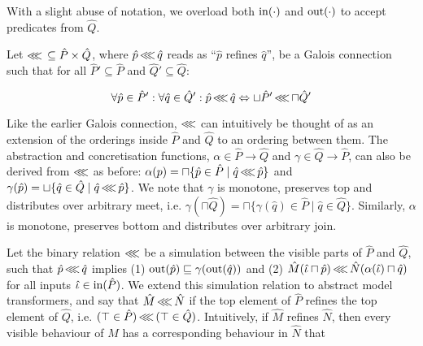 

\noindent With a slight abuse of notation, we overload both $\operatorname{in}(\cdot)$ and $\operatorname{out}(\cdot)$ to accept predicates from $\hat Q$.

Let $\operatorname{\lll} \, \subseteq \hat P \times \hat Q$, where $\hat p \operatorname{\lll} \hat q$ reads as ``$\hat p$ refines $\hat q$'', be a Galois connection such that for all $\hat P' \subseteq \hat P$ and $\hat Q' \subseteq \hat Q$:

\begin{equation*}
\forall \hat p \in \hat P' : \forall \hat q \in \hat Q' : \hat p \operatorname{\lll} \hat q \Leftrightarrow \sqcup \hat P' \operatorname{\lll} \sqcap \hat Q'
\end{equation*}

\noindent Like the earlier Galois connection, $\operatorname{\lll}$ can intuitively be thought of as an extension of the orderings inside $\hat P$ and $\hat Q$ to an ordering between them. The abstraction and concretisation functions, $\alpha \in \hat P \rightarrow \hat Q$ and $\gamma \in \hat Q \rightarrow \hat P$, can also be derived from $\operatorname{\lll}$ as before: $\alpha(p) = \sqcap \{ \hat p \in \hat P \mid \hat q \operatorname{\lll} \hat p \}$ and $\gamma(\hat p) = \sqcup \{ \hat q \in \hat Q \mid \hat q \operatorname{\lll} \hat p \}$. We note that $\gamma$ is monotone, preserves top and distributes over arbitrary meet, i.e. $\gamma(\sqcap \hat Q) = \sqcap \{ \gamma(\hat q) \in \hat P \mid \hat q \in \hat Q\}$. Similarly, $\alpha$ is monotone, preserves bottom and distributes over arbitrary join.

Let the binary relation $\operatorname{\lll}$ be a simulation between the visible parts of $\hat P$ and $\hat Q$, such that $\hat p \operatorname{\lll} \hat q$ implies (1) $\operatorname{out}(\hat p) \sqsubseteq \gamma(\operatorname{out}(\hat q))$ and (2) $\hat M(\hat \iota \sqcap \hat p) \operatorname{\lll} \hat N(\alpha(\hat \iota) \sqcap \hat q)$ for all inputs $\hat \iota \in \operatorname{in}(\hat P)$. We extend this simulation relation to abstract model transformers, and say that $\hat M \operatorname{\lll} \hat N$ if the top element of $\hat P$ refines the top element of $\hat Q$, i.e. $(\top \in \hat P) \operatorname{\lll} \, (\top \in \hat Q)$. Intuitively, if $\hat M$ refines $\hat N$, then every visible behaviour of $\hat M$ has a corresponding behaviour in $\hat N$ that \todo{\ldots}


